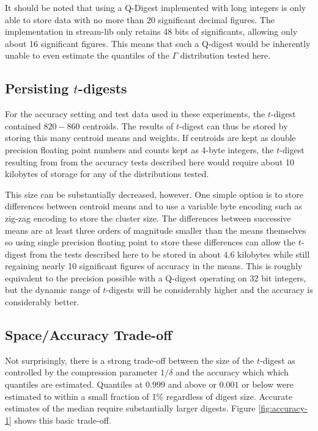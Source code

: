 \documentclass[11pt]{amsart}
\begin{document}
It should be noted that using a Q-Digest implemented with long integers is only able to store data with no more than 20 significant decimal figures.  The implementation in stream-lib only retains 48 bits of significants, allowing only about 16 significant figures.  This means that such a Q-digest would be inherently unable to even estimate the quantiles of the $\Gamma$ distribution tested here.

\subsection{Persisting $t$-digests}
For the accuracy setting and test data used in these experiments, the $t$-digest contained $820-860$ centroids.  The results of $t$-digest can thus be stored by storing this many centroid means and weights.  If centroids are kept as double precision floating point numbers and counts kept as 4-byte integers, the $t$-digest resulting from from the accuracy tests described here would require about 10 kilobytes of storage for any of the distributions tested.

This size can be substantially decreased, however.  One simple option is to store differences between centroid means and to use a variable byte encoding such as zig-zag encoding to store the cluster size.  The differences between successive means are at least three orders of magnitude smaller than the means themselves so using single precision floating point to store these differences can allow the $t$-digest from the tests described here to be stored in about $4.6$ kilobytes while still regaining nearly 10 significant figures of accuracy in the means.  This is roughly equivalent to the precision possible with a Q-digest operating on 32 bit integers, but the dynamic range of $t$-digests will be considerably higher and the accuracy is considerably better.

\subsection{Space/Accuracy Trade-off}
Not surprisingly, there is a strong trade-off between the size of the $t$-digest as controlled by the compression parameter $1/\delta$ and the accuracy which which quantiles are estimated.  Quantiles at $0.999$ and above or $0.001$ or below were estimated to within a small fraction of 1\% regardless of digest size.  Accurate estimates of the median require substantially larger digests.  Figure \ref{fig:accuracy-1} shows this basic trade-off.
\end{document}
